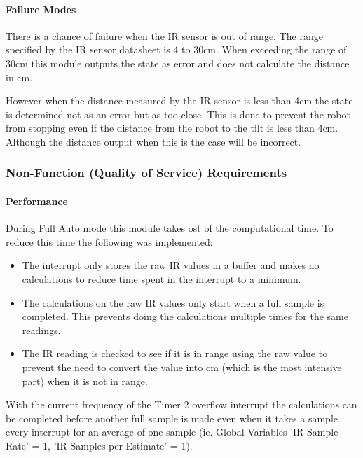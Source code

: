 \documentclass{article}
\begin{document}
\paragraph{Failure Modes}
There is a chance of failure when the IR sensor is out of range. The range specified by the IR sensor datasheet is 4 to 30cm. When exceeding the range of 30cm this module outputs the state as error and does not calculate the distance in cm. 

However when the distance measured by the IR sensor is less than 4cm the state is determined not as an error but as too close. This is done to prevent the robot from stopping even if the distance from the robot to the tilt is less than 4cm. Although the distance output when this is the case will be incorrect.  

\subsubsection{Non-Function (Quality of Service) Requirements}
\paragraph{Performance}
During Full Auto mode this module takes ost of the computational time. To reduce this time the following was implemented:
\begin{itemize}
	\item The interrupt only stores the raw IR values in a buffer and makes no calculations to reduce time spent in the interrupt to a minimum.
	\item The calculations on the raw IR values only start when a full sample is completed. This prevents doing the calculations multiple times for the same readings.
	\item The IR reading is checked to see if it is in range using the raw value to prevent the need to convert the value into cm (which is the most intensive part) when it is not in range. 
\end{itemize}
With the current frequency of the Timer 2 overflow interrupt the calculations can be completed before another full sample is made even when it takes a sample every interrupt for an average of one sample (ie. Global Variables 'IR Sample Rate' = 1,  'IR Samples per Estimate' = 1).
\end{document}
